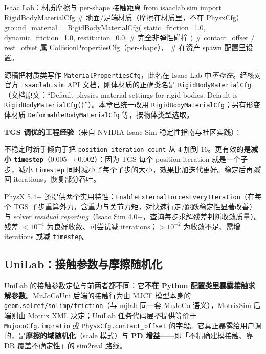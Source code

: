 \begin{codebox}[Python]{Isaac Lab：材质摩擦与 per-shape 接触距离}
from isaaclab.sim import RigidBodyMaterialCfg
# 地面/足端材质（摩擦在材质里，不在 PhysxCfg）
ground_material = RigidBodyMaterialCfg(
    static_friction=1.0,
    dynamic_friction=1.0,
    restitution=0.0,                # 完全非弹性碰撞
)
# contact_offset / rest_offset 属 CollisionPropertiesCfg（per-shape），
# 在资产 spawn 配置里设置。
\end{codebox}

\begin{note}[材质配置类名勘误]
源稿把材质类写作 \verb|MaterialPropertiesCfg|，此名在 Isaac Lab 中\emph{不存在}。经核对官方 \verb|isaaclab.sim| API 文档，刚体材质的正确类名是 \verb|RigidBodyMaterialCfg|（文档原文：``Default physics material settings for rigid bodies. Default is \texttt{RigidBodyMaterialCfg()}''）。本章已统一改用 \verb|RigidBodyMaterialCfg|；另有形变体材质 \verb|DeformableBodyMaterialCfg| 等，按物体类型选取。
\end{note}

\textbf{TGS 调优的工程经验}（来自 NVIDIA Isaac Sim 稳定性指南与社区实践）：

\begin{insight}\label{ins:rlmc-phys-stab}
不稳定时新手倾向于把 \verb|position_iteration_count| 从 4 加到 16。更有效的是\textbf{减小 \texttt{timestep}}（0.005$\to$0.002）：因为 TGS 每个 position iteration 就是一个子步，减小 \verb|timestep| 同时减小了每个子步的大小，效果比加迭代更好。稳定后再\emph{减}回 iterations，恢复部分吞吐。
\end{insight}

PhysX 5.4+ 还提供两个实用特性：\verb|EnableExternalForcesEveryIteration|（在每个 TGS 子步重算外力，含重力与关节力矩，对快速行走/跳跃稳定性显著改善）与 solver \emph{residual reporting}（Isaac Sim 4.0+，查询每步求解残差判断收敛质量）。残差 $<10^{-4}$ 为良好收敛、可尝试减 iterations；$>10^{-2}$ 为收敛不足、需增 iterations 或减 \verb|timestep|。

\subsection{UniLab：接触参数与摩擦随机化}

UniLab 的接触参数定位与前两者都不同：它\textbf{不在 Python 配置类里暴露接触求解参数}。MuJoCoUni 后端的接触行为由 MJCF 模型本身的 \verb|geom.solref/solimp/friction|（与 mjlab 同一套 MuJoCo 语义），MotrixSim 后端则由 Motrix XML 决定；UniLab 任务代码层\emph{不}提供等价于 \verb|MujocoCfg.impratio| 或 \verb|PhysxCfg.contact_offset| 的字段。它真正暴露给用户调的，是\textbf{摩擦的域随机化}（scale 模式）与 \textbf{PD 增益}——即「不精确建模接触、靠 DR 覆盖不确定性」的 sim2real 路线。

